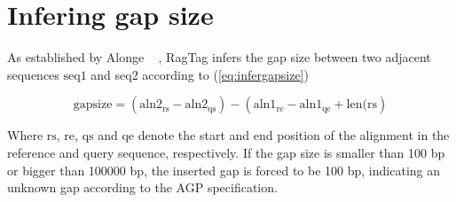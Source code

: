 \section*{Infering gap size} \label{sec:infergapsize}
As established by Alonge \etal ~ \cite{alongeAutomatedAssemblyScaffolding2022}, RagTag infers the gap size between two adjacent sequences $\textrm{seq1}$ and \textrm{seq2} according to (\ref{eq:infergapsize})

\begin{equation}\label{eq:infergapsize}
\textrm{gapsize}  = \left(\textrm{aln2}_\textrm{rs} - \textrm{aln2}_\textrm{qs}\right) - \left(\textrm{aln1}_\textrm{re} - \textrm{aln1}_\textrm{qe} + \textrm{len}(\textrm{rs}\right)
\end{equation}

Where $\textrm{rs}$, $\textrm{re}$, $\textrm{qs}$ and $\textrm{qe}$ denote the start and end position of the alignment in the reference and query sequence, respectively. If the gap size is smaller than 100 bp or bigger than 100000 bp, the inserted gap is forced to be 100 bp, indicating an unknown gap according to the AGP specification.~\cite{AGPSpecificationV2} 
